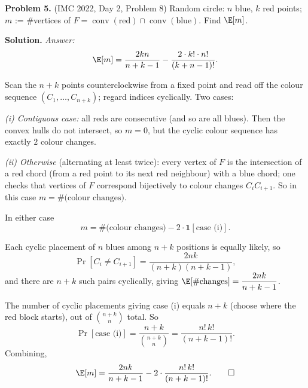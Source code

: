\documentclass{article}
\begin{document}
\textbf{Problem 5.} (IMC 2022, Day 2, Problem 8)
Random circle: \( n \) blue, \( k \) red points; \( m \) := \#vertices of \( F = \operatorname{conv}(\text{red}) \cap \operatorname{conv}(\text{blue}) \). Find \( \E[m] \).

\textbf{Solution.} \textit{Answer:}
\[
\E[m] = \frac{2 k n}{n + k - 1} - \frac{2 \cdot k! \cdot n!}{(k + n - 1)!}.
\]

Scan the \( n + k \) points counterclockwise from a fixed point and read off the colour sequence \( (C_1, \ldots, C_{n+k}) \); regard indices cyclically. Two cases:

\textit{(i) Contiguous case:} all reds are consecutive (and so are all blues). Then the convex hulls do not intersect, so \( m = 0 \), but the cyclic colour sequence has exactly \( 2 \) colour changes.

\textit{(ii) Otherwise} (alternating at least twice): every vertex of \( F \) is the intersection of a red chord (from a red point to its next red neighbour) with a blue chord; one checks that vertices of \( F \) correspond bijectively to colour changes \( C_i C_{i+1} \). So in this case \( m = \#\text{(colour changes)} \).

In either case
\[
m = \#\text{(colour changes)} - 2 \cdot \mathbf{1}[\text{case (i)}].
\]

Each cyclic placement of \( n \) blues among \( n + k \) positions is equally likely, so
\[
\Pr[C_i \neq C_{i+1}] = \frac{2 n k}{(n+k)(n+k-1)},
\]
and there are \( n + k \) such pairs cyclically, giving \( \E[\#\text{changes}] = \dfrac{2 n k}{n + k - 1} \).

The number of cyclic placements giving case (i) equals \( n + k \) (choose where the red block starts), out of \( \binom{n+k}{n} \) total. So
\[
\Pr[\text{case (i)}] = \frac{n + k}{\binom{n+k}{n}} = \frac{n!\, k!}{(n + k - 1)!}.
\]
Combining,
\[
\E[m] = \frac{2 n k}{n + k - 1} - 2 \cdot \frac{n!\, k!}{(n + k - 1)!}. \qed
\]
\end{document}
